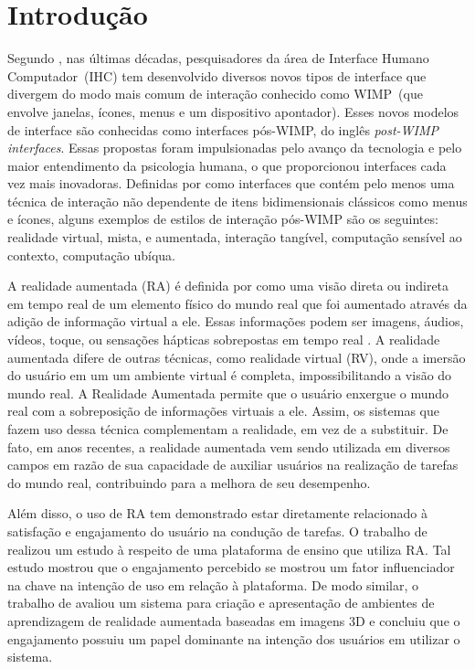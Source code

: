 \documentclass[../main.tex]{subfiles}
\begin{document}
\chapter{Introdução}\label{cap:introducao}


Segundo , nas últimas décadas, pesquisadores da área de Interface Humano Computador~(IHC) tem desenvolvido diversos novos tipos de interface que divergem do modo mais comum de interação conhecido como WIMP~(que envolve janelas, ícones, menus e um dispositivo apontador). Esses novos modelos de interface são conhecidas como interfaces pós-WIMP, do inglês \emph{post-WIMP interfaces}. Essas propostas foram impulsionadas pelo avanço da tecnologia  e pelo maior entendimento da psicologia humana, o que proporcionou interfaces cada vez mais inovadoras. Definidas por  como interfaces que contém pelo menos uma técnica de interação não dependente de itens bidimensionais clássicos como menus e ícones, alguns exemplos de estilos de interação pós-WIMP são os seguintes: realidade virtual, mista, e aumentada, interação tangível, computação sensível ao contexto, computação ubíqua.

A realidade aumentada (RA) é definida por  como uma visão direta ou indireta em tempo real de um elemento físico do mundo real que foi aumentado através da adição de informação virtual a ele. Essas informações podem ser imagens, áudios, vídeos, toque, ou sensações hápticas sobrepostas em tempo real \cite{buchmann2004fingartips}. A realidade aumentada difere de outras técnicas, como realidade virtual (RV), onde a imersão do usuário em um um ambiente virtual é completa, impossibilitando a visão do mundo real. A Realidade Aumentada permite que o usuário enxergue o mundo real com a sobreposição de informações virtuais a ele. Assim, os sistemas que fazem uso dessa técnica complementam a realidade, em vez de a substituir. De fato, em anos recentes, a realidade aumentada vem sendo utilizada em diversos campos em razão de sua capacidade de auxiliar usuários na realização de tarefas do mundo real, contribuindo para a melhora de seu desempenho. 



Além disso, o uso de RA tem demonstrado estar diretamente relacionado à satisfação e engajamento do usuário na condução de tarefas. O trabalho de  realizou um estudo à respeito de uma plataforma de ensino que utiliza RA. Tal estudo mostrou que o engajamento percebido se mostrou um fator influenciador na chave na intenção de uso em relação à plataforma. De modo similar, o trabalho de  avaliou um sistema para criação e apresentação de ambientes de aprendizagem de realidade aumentada baseadas em imagens 3D e concluiu que o engajamento possuiu um papel dominante na intenção dos usuários em utilizar o sistema.
\end{document}
